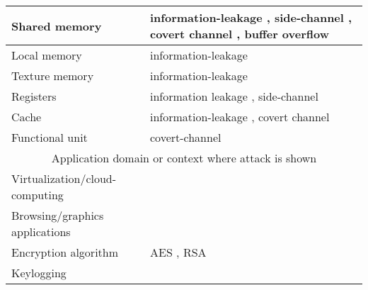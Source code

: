 \begin{table}[htbp]
\begin{tabular}{|p{3.0cm}|p{13cm}|}
Shared memory & information-leakage \cite{lee2014stealing,bellekens2015data,pietro2016cuda,lombardisecure,hayes2017gpu}, side-channel \cite{jiang2017novel,jiang2016complete}, covert channel \cite{naghibijouybari2017constructing},  buffer overflow \cite{di2016study} \\\hline

Local memory & information-leakage \cite{pietro2016cuda,lombardisecure,lee2014stealing,hayes2017gpu} \\\hline
Texture memory & information-leakage \cite{bellekens2015data} \\\hline
Registers & information leakage \cite{pietro2016cuda,lombardisecure,hayes2017gpu}, side-channel \cite{jiang2016complete}
\\\hline
Cache & information-leakage \cite{lee2014stealing}, covert channel \cite{naghibijouybari2017constructing} \\\hline
Functional unit & covert-channel \cite{naghibijouybari2017constructing}  \\\hline
\multicolumn{2}{|c|}{Application domain or context where attack is shown}   \\\hline

Virtualization/cloud-computing &  \cite{maurice2014confidentiality,zhou2017vulnerable,lombardisecure} \\\hline
Browsing/graphics applications &  \cite{lee2014stealing,zhou2017vulnerable,zhang2015forensically,danisevskis2013dark,patterson2013vulnerability,hayes2017gpu} \\\hline

Encryption algorithm & AES   \cite{kadam2018rcoal,pietro2016cuda,jiang2017novel,jiang2016complete,luo2015side,kim2016demand}, RSA \cite{kim2016demand} \\\hline
Keylogging & \cite{ladakis2013you} \\\hline

\end{tabular}
\end{table}
 
